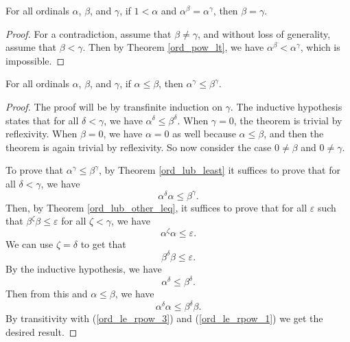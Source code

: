 \documentclass[../../math.tex]{subfiles}
\begin{document}
\begin{theorem} \label{ord_pow_lcancel}
    For all ordinals $\alpha$, $\beta$, and $\gamma$, if $1 < \alpha$ and
    $\alpha ^ \beta = \alpha ^ \gamma$, then $\beta = \gamma$.
\end{theorem}
\begin{proof}
    For a contradiction, assume that $\beta \neq \gamma$, and without loss of
    generality, assume that $\beta < \gamma$.  Then by Theorem \ref{ord_pow_lt},
    we have $\alpha ^ \beta < \alpha ^ \gamma$, which is impossible.
\end{proof}

\begin{theorem} \label{ord_le_rpow}
    For all ordinals $\alpha$, $\beta$, and $\gamma$, if $\alpha \leq \beta$,
    then $\alpha ^ \gamma \leq \beta ^ \gamma$.
\end{theorem}
\begin{proof}
    The proof will be by transfinite induction on $\gamma$.  The inductive
    hypothesis states that for all $\delta < \gamma$, we have $\alpha ^ \delta
    \leq \beta ^ \delta$.  When $\gamma = 0$, the theorem is trivial by
    reflexivity.  When $\beta = 0$, we have $\alpha = 0$ as well because $\alpha
    \leq \beta$, and then the theorem is again trivial by reflexivity.  So now
    consider the case $0 \neq \beta$ and $0 \neq \gamma$.

    To prove that $\alpha^\gamma \leq \beta^\gamma$, by Theorem
    \ref{ord_lub_least} it suffices to prove that for all $\delta < \gamma$, we
    have
    \[
        \alpha ^ \delta \alpha \leq \beta ^ \gamma.
    \]
    Then, by Theorem \ref{ord_lub_other_leq}, it suffices to prove that for all
    $\varepsilon$ such that $\beta^\zeta \beta \leq \varepsilon$ for all $\zeta
    < \gamma$, we have
    \[
        \alpha ^ \zeta \alpha \leq \varepsilon.
    \]
    We can use $\zeta = \delta$ to get that
    \begin{equation} \label{ord_le_rpow_1}
        \beta ^ \delta \beta \leq \varepsilon.
    \end{equation}
    By the inductive hypothesis, we have
    \begin{equation} \label{ord_le_rpow_2}
        \alpha ^ \delta \leq \beta ^ \delta.
    \end{equation}
    Then from this and $\alpha \leq \beta$, we have
    \begin{equation} \label{ord_le_rpow_3}
        \alpha^\delta \alpha \leq \beta^\delta \beta.
    \end{equation}
    By transitivity with (\ref{ord_le_rpow_3}) and (\ref{ord_le_rpow_1}) we get
    the desired result.
\end{proof}
\end{document}
